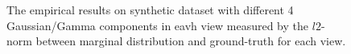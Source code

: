 \documentclass[11pt]{article}
\begin{document}
\begin{figure}
\caption{The empirical results on synthetic dataset with different 4 Gaussian/Gamma components in eavh view measured by the $l2$-norm between marginal distribution and ground-truth for each view.}
\end{figure}
\end{document}
